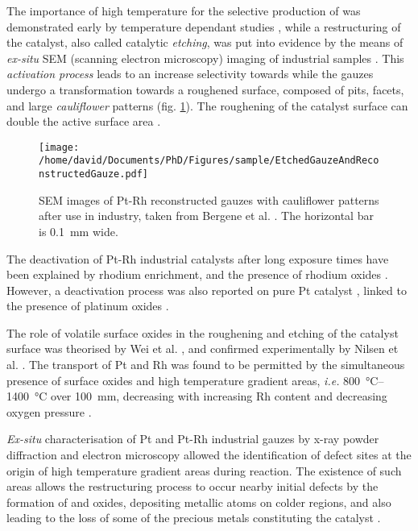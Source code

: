The importance of high temperature for the selective production of  was demonstrated early by temperature dependant studies \parencite{Nutt1968, Pignet1974, Li1997}, while a restructuring of the catalyst, also called catalytic \textit{etching}, was put into evidence by the means of \textit{ex-situ} SEM (scanning electron microscopy) imaging of industrial samples \parencite{McCabe1974, FlytzaniStephanopoulos1979, McCabe1986}.
This \textit{activation process} leads to an increase selectivity towards  while the gauzes undergo a transformation towards a roughened surface, composed of pits, facets, and large \textit{cauliflower} patterns (fig. \ref{fig:Gauzes}).
The roughening of the catalyst surface can double the active surface area \parencite{Hatscher2008}.

\begin{figure}[!htb]
    \centering
    \texttt{[image: /home/david/Documents/PhD/Figures/sample/EtchedGauzeAndReconstructedGauze.pdf]}
    \caption{
    SEM images of Pt-Rh reconstructed gauzes with cauliflower patterns after use in industry, taken from Bergene et al. \parencite*{Bergene1996}.
    The horizontal bar is \qty{0.1}{\mm} wide.
    }
    \label{fig:Gauzes}
\end{figure}

The deactivation of Pt-Rh industrial catalysts after long exposure times have been explained by rhodium enrichment, and the presence of rhodium oxides \parencite{Fierro1990, Fierro1992, Bergene1996}.
However, a deactivation process was also reported on pure Pt catalyst \parencite{Ostermaier1974}, linked to the presence of platinum oxides \parencite{Ostermaier1976}.

The role of volatile surface oxides in the roughening and etching of the catalyst surface was theorised by Wei et al. \parencite*{Wei1996}, and confirmed experimentally by Nilsen et al. \parencite*{Nilsen2001}.
The transport of Pt and Rh was found to be permitted by the simultaneous presence of surface oxides and high temperature gradient areas, \textit{i.e.} \qtyrange{800}{1400}{\degreeCelsius} over \qty{100}{\mm}, decreasing with increasing Rh content and decreasing oxygen pressure \parencite{Hannevold2005a}.

\textit{Ex-situ} characterisation of Pt and Pt-Rh industrial gauzes by x-ray powder diffraction and electron microscopy allowed the identification of defect sites at the origin of high temperature gradient areas during reaction.
The existence of such areas allows the restructuring process to occur nearby initial defects by the formation of  and  oxides, depositing metallic atoms on colder regions, and also leading to the loss of some of the precious metals constituting the catalyst \parencite{Hannevold2005}.

